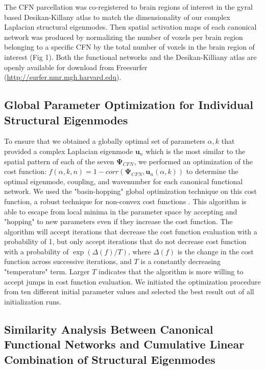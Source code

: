 The CFN parcellation was co-registered to brain regions of interest in the gyral based Desikan-Killany atlas \cite{Desikan2006} to match the dimensionality of our complex Laplacian structural eigenmodes. Then spatial activation maps of each canonical network was produced by normalizing the number of voxels per brain region belonging to a specific CFN by the total number of voxels in the brain region of interest (Fig 1). Both the functional networks and the Desikan-Killiany atlas are openly available for download from Freesurfer \cite{Fischl2012} (\url{http://surfer.nmr.mgh.harvard.edu}).

\subsection{Global Parameter Optimization for Individual Structural Eigenmodes}
To ensure that we obtained a globally optimal set of parameters ${\alpha, k}$ that provided a complex Laplacian eigenmode $\pmb{u}_n$ which is the most similar to the spatial pattern of each of the seven $\pmb{\Psi}_{CFN}$, we performed
an optimization of the cost function: $f(\alpha,k,n) = 1- corr(\pmb{\Psi}_{CFN}, \pmb{u}_n(\alpha, k))$ to determine the optimal eigenmode, coupling, and wavenumber for each canonical functional network. We used the "basin-hopping" global optimization technique on this cost function, a robust technique for non-convex cost functions \cite{Wales1997}. This algorithm is able to escape from local minima in the parameter space by accepting and "hopping" to new parameters even if they increase the cost function. The algorithm will accept iterations that decrease the cost function evaluation with a probability of 1, but only accept iterations that do not decrease cost function with a probability of $\exp(\Delta (f)/{T})$, where $\Delta(f)$ is the change in the cost function across successive iterations, and $T$ is a constantly decreasing "temperature" term. Larger $T$ indicates that the algorithm is more willing to accept jumps in cost function evaluation. We initiated the optimization procedure from ten different initial parameter values and selected the best result out of all initialization runs.

\subsection{Similarity Analysis Between Canonical Functional Networks and Cumulative Linear Combination of Structural Eigenmodes}

